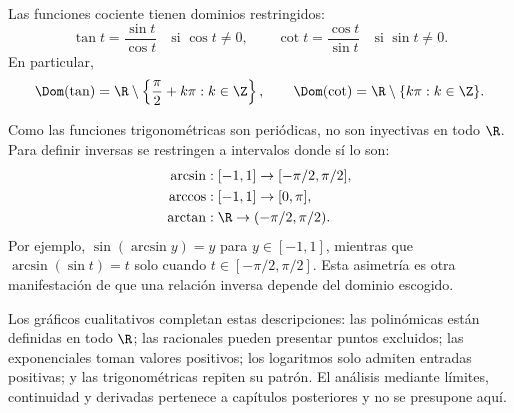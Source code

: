 Las funciones cociente tienen dominios restringidos:
\[
  \tan t=\frac{\sin t}{\cos t}
  \quad\text{si }\cos t\ne0,
  \qquad
  \cot t=\frac{\cos t}{\sin t}
  \quad\text{si }\sin t\ne0.
\]
En particular,
\[
 \Dom(\tan)=\R\setminus\left\{\frac\pi2+k\pi:k\in\Z\right\},
 \qquad
 \Dom(\cot)=\R\setminus\{k\pi:k\in\Z\}.
\]

Como las funciones trigonométricas son periódicas, no son inyectivas en todo
\(\R\). Para definir inversas se restringen a intervalos donde sí lo son:
\[
\begin{aligned}
 \arcsin&:[-1,1]\to[-\pi/2,\pi/2],\\
 \arccos&:[-1,1]\to[0,\pi],\\
 \arctan&:\R\to(-\pi/2,\pi/2).
\end{aligned}
\]
Por ejemplo, \(\sin(\arcsin y)=y\) para \(y\in[-1,1]\), mientras que
\(\arcsin(\sin t)=t\) solo cuando \(t\in[-\pi/2,\pi/2]\). Esta asimetría es
otra manifestación de que una relación inversa depende del dominio escogido.

Los gráficos cualitativos completan estas descripciones: las polinómicas están
definidas en todo \(\R\); las racionales pueden presentar puntos excluidos; las
exponenciales toman valores positivos; los logaritmos solo admiten entradas
positivas; y las trigonométricas repiten su patrón. El análisis mediante
límites, continuidad y derivadas pertenece a capítulos posteriores y no se
presupone aquí.
